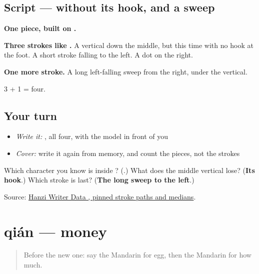 \subsection*{Script —  without its hook, and a sweep}

\begin{quote}
\end{quote}

\textbf{One piece, built on .}

\textbf{Three strokes like .} A vertical down the middle, but this time with no hook at the foot. A short stroke falling to the left. A dot on the right.

\textbf{One more stroke.} A long left-falling sweep from the right, under the vertical.

3 + 1 = four.

\subsection*{Your turn}
\begin{itemize}
\raggedright
  \item \emph{Write it:} , all four, with the model in front of you
  \item \emph{Cover:} write it again from memory, and count the pieces, not the strokes
\end{itemize}

\begin{tcolorbox}[breakable,colback=teal!4,colframe=teal!35!black,title={Before you move on}]
Which character you know is inside ? (\textbf{}.) What does the middle vertical lose? (\textbf{Its hook}.) Which stroke is last? (\textbf{The long sweep to the left}.)

Source: \href{https://raw.githubusercontent.com/chanind/hanzi-writer-data/68d10a4b21150cae5e1ebbd223eed289cf32d90c/data/\%E5\%B0\%91.json}{Hanzi Writer Data , pinned stroke paths and medians}.
\end{tcolorbox}
\section[qián]{qián — money}

\label{lesson:ZH-C41-qian}



\begin{quote}
Before the new one: say the Mandarin for egg, then the Mandarin for how much.
\end{quote}

